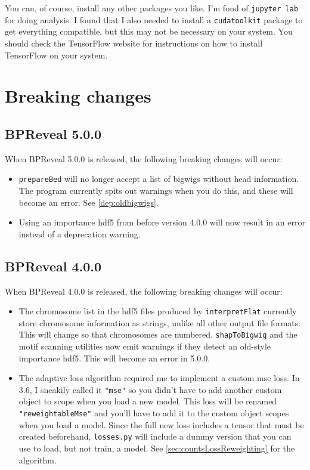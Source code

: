 \documentclass{article}
\begin{document}
You can, of course, install any other packages you like.
I'm fond of \texttt{jupyter lab} for doing analysis.
I found that I also needed to install a \texttt{cudatoolkit} package to get
everything compatible, but this may not be necessary on your system.
You should check the TensorFlow website for instructions on how to install
TensorFlow on your system.


\newpage

\section{Breaking changes}


\subsection{BPReveal 5.0.0}
When BPReveal 5.0.0 is released, the following breaking changes will occur:
\begin{itemize}
    \item \texttt{prepareBed} will no longer accept a list of bigwigs without
        head information.
        The program currently spits out warnings when you do this, and these
        will become an error.
        See \ref{dep:oldbigwigs}.
    \item Using an importance hdf5 from before version 4.0.0 will now result
        in an error instead of a deprecation warning.
\end{itemize}

\subsection{BPReveal 4.0.0}
When BPReveal 4.0.0 is released, the following breaking changes will occur:
\begin{itemize}
    \item The chromosome list in the hdf5 files produced by
        \texttt{interpretFlat} currently store chromosome information as
        strings, unlike all other output file formats.
        This will change so that chromosomes are numbered.
        \texttt{shapToBigwig} and the motif scanning utilities now emit
        warnings if they detect an old-style importance hdf5. This will become
        an error in 5.0.0.
    \item The adaptive loss algorithm required me to implement a custom mse
        loss.
        In 3.6, I sneakily called it \texttt{"mse"} so you didn't have to add
        another custom object to scope when you load a new model.
        This loss will be renamed \texttt{"reweightableMse"} and you'll have to
        add it to the custom object scopes when you load a model.
        Since the full new loss includes a tensor that must be created
        beforehand, \texttt{losses.py} will include a dummy version that you
        can use to load, but not train, a model.
        See \ref{sec:countsLossReweighting} for the algorithm.
\end{itemize}
\end{document}
